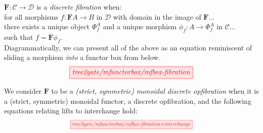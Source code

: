 \begin{defn}
$\mathbf{F}: \mathcal{C} \rightarrow \mathcal{D}$ is a \emph{discrete fibration} when:\\
for all morphisms $f: \mathbf{F}A \rightarrow B$ in $\mathcal{D}$ with domain in the image of $\mathbf{F}$...\\
there exists a unique object $\Phi^A_f$ and a unique morphism $\phi_f: A \rightarrow \Phi^A_f$ in $\mathcal{C}$...\\
such that $f = \mathbf{F}\phi_f$.\\

Diagrammatically, we can present all of the above as an equation reminiscent of sliding a morphism \emph{into} a functor box from below.
\[\tikzfig{tree2gate/mfunctorbox/mfbox-fibration}\]
\end{defn}

\begin{defn}
We consider $\mathbf{F}$ to be a \emph{(strict, symmetric) monoidal discrete opfibration} when it is a (strict, symmetric) monoidal functor, a discrete opfibration, and the following equations relating lifts to interchange hold:
\[\scalebox{0.75}{\tikzfig{tree2gate/mfunctorbox/mfbox-fibration+interchange}}\]
\end{defn}

